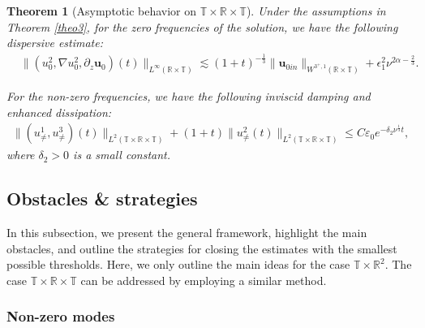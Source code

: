 \documentclass[11pt,reqno]{article}
\newtheorem{theo}{Theorem}[section]
\numberwithin{equation}{section}
\newcommand\R{{\mathbb R}}
\newcommand\T{{\mathbb T}}
\newcommand\uu{\bm{u}}
\let\pa=\partial
\let\al=\alpha
\let\var=\varepsilon
\let\f=\frac
\let\ep=\epsilon
\begin{document}
\begin{theo}[Asymptotic behavior on $\T\times\R\times\T$]
	\label{theo4}
	Under the assumptions in Theorem \ref{theo3}, for the zero frequencies of the solution, we have the following dispersive estimate:
	\begin{align}
    \label{Asy-u0-1'}
		&\|(u^2_0,\nabla u^2_0,\pa_z\uu_0)(t)\|_{L^\infty(\R\times \T)}\lesssim (1+t)^{-\f13} \|\uu_{0in}\|_{W^{{3}^+,1}(\R\times \T)}+\ep_1^2\nu^{2\al-\f23}.
	\end{align}
	
	For the non-zero frequencies, we have the following inviscid damping and enhanced dissipation:
	\begin{align}\label{Asy-unot'}
		\|(u_{\not=}^1,u_{\not=}^3)(t)\|_{L^2(\mathbb{T}\times \R\times \T)}
		+(1+t)\|u_{\not=}^2(t)\|_{L^2(\mathbb{T}\times \R\times \T)}
		\leq C \var_0 e^{-\delta_2 \nu^{\f13}t},
	\end{align}
	where $\delta_2>0$ is a small constant.
\end{theo}





\subsection{Obstacles \& strategies}	
\label{sec-strategy}
In this subsection, we present the general framework, highlight the main obstacles, and outline the strategies for closing the estimates with the smallest possible thresholds. Here, we only outline the main ideas for the case $\T\times\R^2$. The case $\T \times \R \times \T$ can be addressed by employing a similar method.




\subsubsection{Non-zero modes}
\end{document}
